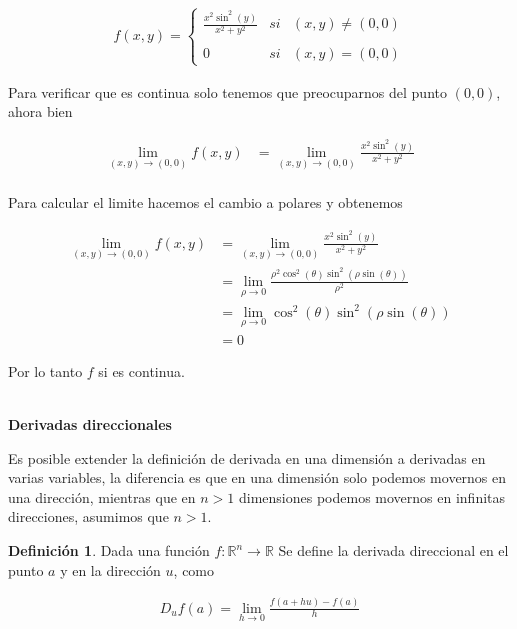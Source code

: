 \documentclass{article}
\theoremstyle{plain}
\theoremstyle{definition}
\newtheorem{defin}[thm]{Definición}
\begin{document}
\begin{align*}
f(x,y) = \left\{ \begin{array}{lcc} \frac{x^2\sin^2(y)}{x^2+y^2} & si & (x,y) \neq (0,0) \\ \\ 0 & si & (x,y) =(0,0) \end{array} \right.
\end{align*}

Para verificar que es continua solo tenemos que preocuparnos del punto $(0,0)$, ahora bien


\begin{align*}
\lim_{(x,y) \to (0,0)} f(x,y) &= \lim_{(x,y) \to (0,0)} \frac{x^2\sin^2(y)}{x^2+y^2} \\
\end{align*}


Para calcular el limite hacemos el cambio a polares y obtenemos


\begin{align*}
\lim_{(x,y) \to (0,0)} f(x,y) &= \lim_{(x,y) \to (0,0)} \frac{x^2\sin^2(y)}{x^2+y^2} \\
&= \lim_{\rho \to 0} \frac{\rho^2 \cos^2(\theta)\sin^2(\rho \sin(\theta))}{\rho^2} \\
&= \lim_{\rho \to 0} \cos^2(\theta)\sin^2(\rho \sin(\theta)) \\
&=0
\end{align*}


Por lo tanto $f$ si es continua. \\ \\

\newpage



\begin{center}
    \Large{\textbf{Derivadas direccionales}}
\end{center}

Es posible extender la definición de derivada en una dimensión a derivadas en varias variables, la diferencia es que en una dimensión solo podemos movernos en una dirección, mientras que en $n>1$ dimensiones podemos movernos en infinitas direcciones, asumimos que $n > 1$. \\

\begin{defin}Dada una función $f: \mathbb{R}^n \to \mathbb{R}$ Se define la derivada direccional  en el punto $a$ y en la dirección $u $, como
\end{defin}

\begin{align*}
    D_u f (a) = \lim_{ h \to 0 } \frac{f(a+hu)-f(a)}{h}
\end{align*}
\end{document}
